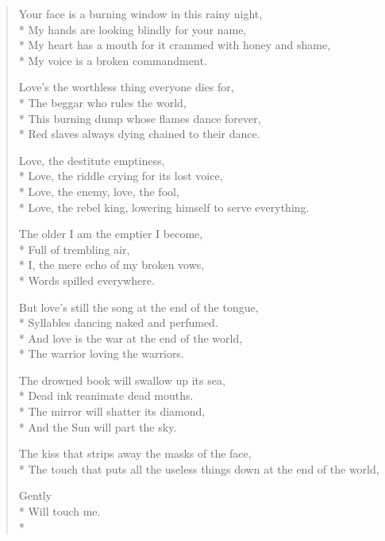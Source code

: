 \documentclass[english,11pt,letterpaper,onecolumn]{scrbook}
\begin{document}
\begin{verse}
Your face is a burning window in this rainy night, \\*
My hands are looking blindly for your name, \\*
My heart has a mouth for it crammed with honey and shame, \\*
My voice is a broken commandment.

Love's the worthless thing everyone dies for, \\*
The beggar who rules the world, \\*
This burning dump whose flames dance forever, \\*
Red slaves always dying chained to their dance. 

Love, the destitute emptiness, \\*
Love, the riddle crying for its lost voice, \\*
Love, the enemy, love, the fool, \\*
Love, the rebel king, lowering himself to serve everything. 

The older I am the emptier I become, \\*
Full of trembling air, \\*
I, the mere echo of my broken vows, \\*
Words spilled everywhere. 

But love's still the song at the end of the tongue, \\*
Syllables dancing naked and perfumed. \\*
And love is the war at the end of the world, \\*
The warrior loving the warriors. 

The drowned book will swallow up its sea, \\*
Dead ink reanimate dead mouths. \\*
The mirror will shatter its diamond, \\*
And the Sun will part the sky. 

The kiss that strips away the masks of the face, \\*
The touch that puts all the useless things down at the end of the world, 

Gently \\*
Will touch me.\\*
\end{verse}


\newpage
{}
\end{document}
